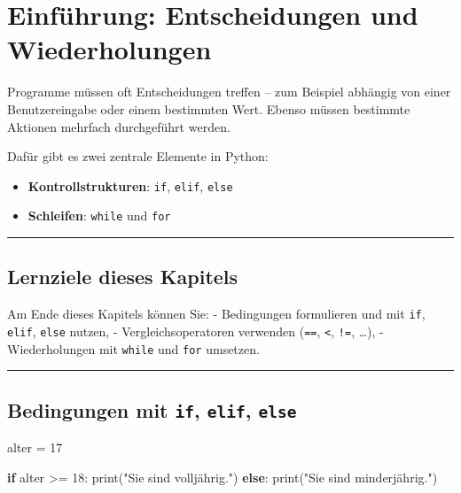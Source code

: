 \documentclass[
  letterpaper,
  DIV=11,
  numbers=noendperiod]{scrreprt}
\newenvironment{Shaded}{\begin{snugshade}}{\end{snugshade}}
\newcommand{\BuiltInTok}[1]{\textcolor[rgb]{0.00,0.23,0.31}{#1}}
\newcommand{\ControlFlowTok}[1]{\textcolor[rgb]{0.00,0.23,0.31}{\textbf{#1}}}
\newcommand{\DecValTok}[1]{\textcolor[rgb]{0.68,0.00,0.00}{#1}}
\newcommand{\NormalTok}[1]{\textcolor[rgb]{0.00,0.23,0.31}{#1}}
\newcommand{\OperatorTok}[1]{\textcolor[rgb]{0.37,0.37,0.37}{#1}}
\newcommand{\StringTok}[1]{\textcolor[rgb]{0.13,0.47,0.30}{#1}}
\providecommand{\tightlist}{%
  \setlength{\itemsep}{0pt}\setlength{\parskip}{0pt}}\usepackage{longtable,booktabs,array}
\begin{document}
\chapter{Einführung: Entscheidungen und
Wiederholungen}\label{einfuxfchrung-entscheidungen-und-wiederholungen}

Programme müssen oft Entscheidungen treffen -- zum Beispiel abhängig von
einer Benutzereingabe oder einem bestimmten Wert. Ebenso müssen
bestimmte Aktionen mehrfach durchgeführt werden.

Dafür gibt es zwei zentrale Elemente in Python:

\begin{itemize}
\tightlist
\item
  \textbf{Kontrollstrukturen}: \texttt{if}, \texttt{elif}, \texttt{else}
\item
  \textbf{Schleifen}: \texttt{while} und \texttt{for}
\end{itemize}

\begin{center}\rule{0.5\linewidth}{0.5pt}\end{center}

\section{Lernziele dieses Kapitels}\label{lernziele-dieses-kapitels-2}

Am Ende dieses Kapitels können Sie: - Bedingungen formulieren und mit
\texttt{if}, \texttt{elif}, \texttt{else} nutzen, - Vergleichsoperatoren
verwenden (\texttt{==}, \texttt{\textless{}}, \texttt{!=}, \ldots), -
Wiederholungen mit \texttt{while} und \texttt{for} umsetzen.

\begin{center}\rule{0.5\linewidth}{0.5pt}\end{center}

\section{\texorpdfstring{Bedingungen mit \texttt{if}, \texttt{elif},
\texttt{else}}{Bedingungen mit if, elif, else}}\label{bedingungen-mit-if-elif-else}

\begin{Shaded}
\begin{Highlighting}[]
\NormalTok{alter }\OperatorTok{=} \DecValTok{17}

\ControlFlowTok{if}\NormalTok{ alter }\OperatorTok{\textgreater{}=} \DecValTok{18}\NormalTok{:}
    \BuiltInTok{print}\NormalTok{(}\StringTok{"Sie sind volljährig."}\NormalTok{)}
\ControlFlowTok{else}\NormalTok{:}
    \BuiltInTok{print}\NormalTok{(}\StringTok{"Sie sind minderjährig."}\NormalTok{)}
\end{Highlighting}
\end{Shaded}
\end{document}
